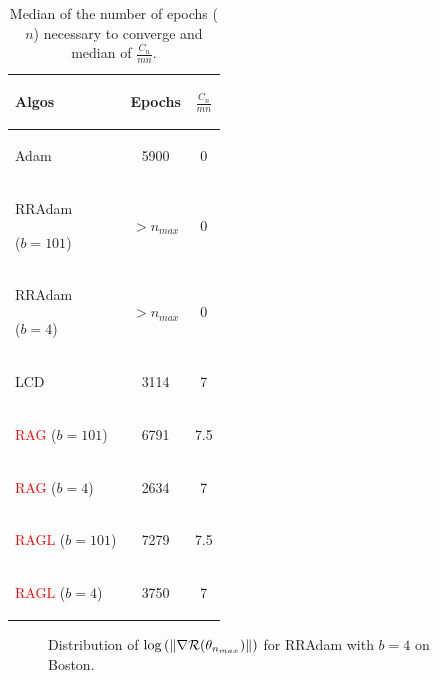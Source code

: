 \begin{table}[h!]
	\centering
	\caption{Median of the number of epochs ($n$) necessary to converge and median of $\frac{C_n}{mn}$.}
	\begin{tabular}{lcc}
		\toprule
		\begin{bf} Algos \end{bf} & \begin{bf}Epochs \end{bf} & \begin{bf}$\frac{C_n}{mn}$\end{bf} \\ \midrule
		\begin{bf}Adam\end{bf} & 5900 & 0 \\ \midrule
		\begin{bf}RRAdam\end{bf} ($b=101$) & $>n_{max}$ & 0 \\ \midrule
		\begin{bf}RRAdam\end{bf} ($b=4$) & $>n_{max}$ & 0 \\ \midrule
		\begin{bf}LCD\end{bf} & 3114 & 7 \\ \midrule
		\begin{bf}\textcolor{red}{RAG} ($b=101$) \end{bf} & 6791 & 7.5 \\ \midrule
		\begin{bf}\textcolor{red}{RAG} ($b=4$)\end{bf} & 2634 & 7  \\ \midrule
		\begin{bf}\textcolor{red}{RAGL} ($b=101$)\end{bf} & 7279 & 7.5 \\ \midrule
		\begin{bf}\textcolor{red}{RAGL} ($b=4$) \end{bf} & 3750 & 7 \\ \bottomrule
	\end{tabular}
	\label{Boston_epochs}
\end{table}

\begin{figure}[h!]
	\centering
	\scalebox{0.9}{}
	\caption{Distribution of $\log\left(\|\nabla \mathcal{R}(\theta_{n_{max}})\|\right)$ for RRAdam with $b=4$ on Boston.}
	\label{Boston_grads}
\end{figure}

